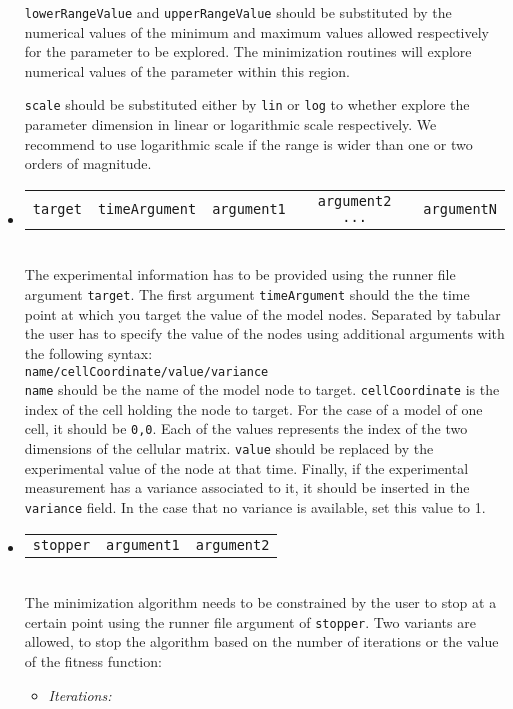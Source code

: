 \documentclass[a4paper, 11pt]{article}
\begin{document}
\begin{itemize}
  \texttt{lowerRangeValue} and \texttt{upperRangeValue} should be substituted by the numerical values of the minimum and maximum values allowed respectively for the parameter to be explored.
  The minimization routines will explore numerical values of the parameter within this region.

  \texttt{scale} should be substituted either by \texttt{lin} or \texttt{log} to whether explore the parameter dimension in linear or logarithmic scale respectively.
  We recommend to use logarithmic scale if the range is wider than one or two orders of magnitude.
\item \begin{tabular}{ccccc}\texttt{target}&\texttt{timeArgument}&\texttt{argument1}&\texttt{argument2 ...}&\texttt{argumentN}\end{tabular}\\[1.5ex]
  The experimental information has to be provided using the runner file argument \texttt{target}.
  The first argument \texttt{timeArgument} should the the time point at which you target the value of the model nodes.
  Separated by tabular the user has to specify the value of the nodes using additional arguments with the following syntax:\\[1.5ex]
  \texttt{name/cellCoordinate/value/variance}\\[1.5ex]
  \texttt{name} should be the name of the model node to target.
  \texttt{cellCoordinate} is the index of the cell holding the node to target. 
  For the case of a model of one cell, it should be \texttt{0,0}.
  Each of the values represents the index of the two dimensions of the cellular matrix.
  \texttt{value} should be replaced by the experimental value of the node at that time.
  Finally, if the experimental measurement has a variance associated to it, it should be inserted in the \texttt{variance} field.
  In the case that no variance is available, set this value to 1.
\item \begin{tabular}{ccc}\texttt{stopper}&\texttt{argument1}&\texttt{argument2}\end{tabular}\\[1.5ex]
  The minimization algorithm needs to be constrained by the user to stop at a certain point using the runner file argument of \texttt{stopper}.
  Two variants are allowed, to stop the algorithm based on the number of iterations or the value of the fitness function:
  \begin{itemize}
    \item \textit{Iterations:}

\end{itemize}
\end{itemize}
\end{document}
